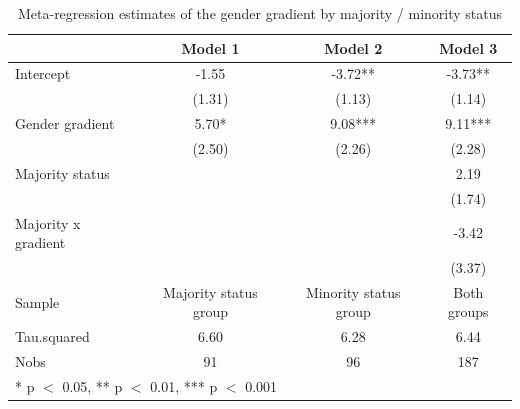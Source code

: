 \begin{table}
\centering
\caption{Meta-regression estimates of the gender gradient by majority / minority status}
\centering
\begin{tabular}[t]{lccc}
\toprule
  & Model 1 & Model 2 & Model 3\\
\midrule
Intercept & -1.55 & -3.72** & -3.73**\\
 & (1.31) & (1.13) & (1.14)\\
Gender gradient & 5.70* & 9.08*** & 9.11***\\
 & (2.50) & (2.26) & (2.28)\\
Majority status &  &  & 2.19\\
 &  &  & (1.74)\\
Majority x gradient &  &  & -3.42\\
 &  &  & (3.37)\\
\midrule
Sample & Majority status group & Minority status group & Both groups\\
Tau.squared & 6.60 & 6.28 & 6.44\\
Nobs & 91 & 96 & 187\\
\bottomrule
\multicolumn{4}{l}{\rule{0pt}{1em}* p $<$ 0.05, ** p $<$ 0.01, *** p $<$ 0.001}\\
\end{tabular}
\end{table}
